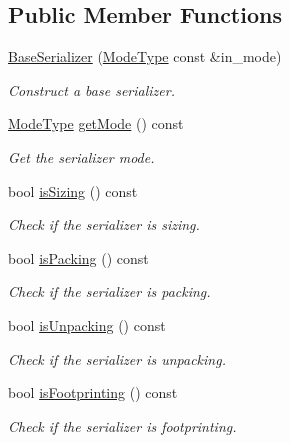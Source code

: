 \subsection*{Public Member Functions}
\begin{DoxyCompactItemize}
\item 
\hyperlink{structcheckpoint_1_1_base_serializer_a54ef6d9ab0a03d637822dcdacd146763}{Base\+Serializer} (\hyperlink{namespacecheckpoint_ae2509499ccd8b1dc48fb535bf8aa3059}{Mode\+Type} const \&in\+\_\+mode)
\begin{DoxyCompactList}\small\item\em Construct a base serializer. \end{DoxyCompactList}\item 
\hyperlink{namespacecheckpoint_ae2509499ccd8b1dc48fb535bf8aa3059}{Mode\+Type} \hyperlink{structcheckpoint_1_1_base_serializer_ad9a3bf9aa8081b6efdf8a45ba92ef641}{get\+Mode} () const
\begin{DoxyCompactList}\small\item\em Get the serializer mode. \end{DoxyCompactList}\item 
bool \hyperlink{structcheckpoint_1_1_base_serializer_a2d28600a09495b5b9d9b90ae27caa708}{is\+Sizing} () const
\begin{DoxyCompactList}\small\item\em Check if the serializer is sizing. \end{DoxyCompactList}\item 
bool \hyperlink{structcheckpoint_1_1_base_serializer_a1a91b7c0fc85cbd31356791bbf288b0e}{is\+Packing} () const
\begin{DoxyCompactList}\small\item\em Check if the serializer is packing. \end{DoxyCompactList}\item 
bool \hyperlink{structcheckpoint_1_1_base_serializer_a36efbc9aa78bd2d4b017ac40dacfe9b7}{is\+Unpacking} () const
\begin{DoxyCompactList}\small\item\em Check if the serializer is unpacking. \end{DoxyCompactList}\item 
bool \hyperlink{structcheckpoint_1_1_base_serializer_a76960f01f04457bca6a40d91d2c4b486}{is\+Footprinting} () const
\begin{DoxyCompactList}\small\item\em Check if the serializer is footprinting. \end{DoxyCompactList}\item 

\end{DoxyCompactItemize}
